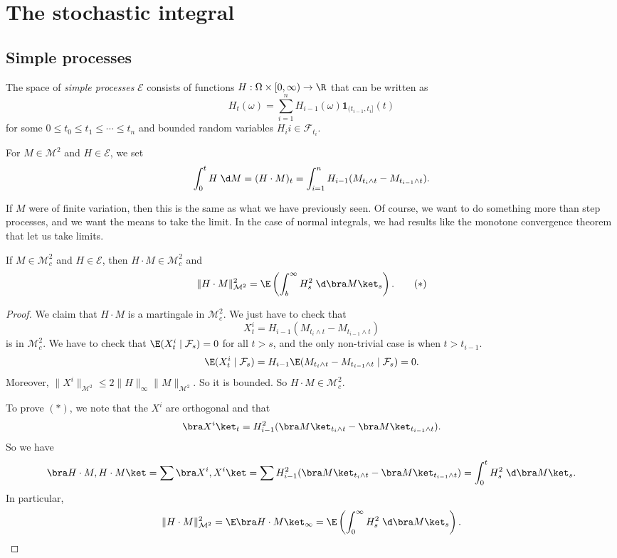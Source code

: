 \documentclass[a4paper]{article}
\begin{document}
\section{The stochastic integral}%
\subsection{Simple processes}

\begin{defi}
  The space of \emph{simple processes} $\mathcal{E}$ consists of functions $H: \Omega \times [0, \infty) \to \R$ that can be written as
  \[
    H_t(\omega) = \sum_{i = 1}^n H_{i - 1}(\omega) \mathbf{1}_{(t_{i - 1}, t_i]} (t)
  \]
  for some $0 \leq t_0 \leq t_1 \leq \cdots \leq t_n$ and bounded random variables $H_ii \in \mathcal{F}_{t_i}$.
\end{defi}

\begin{defi}[$H\cdot M$]
  For $M \in \mathcal{M}^2$ and $H \in \mathcal{E}$, we set
  \[
    \int_0^t H \;\d M = (H\cdot M)_t = \int_{i = 1}^n H_{i - 1} (M_{t_i \wedge t} - M_{t_{i - 1} \wedge t}).
  \]
\end{defi}
If $M$ were of finite variation, then this is the same as what we have previously seen. Of course, we want to do something more than step processes, and we want the means to take the limit. In the case of normal integrals, we had results like the monotone convergence theorem that let us take limits.

\begin{prop}
  If $M \in \mathcal{M}_c^2$ and $H \in \mathcal{E}$, then $H \cdot M \in \mathcal{M}_c^2$ and
  \[
    \|H \cdot M\|_{\mathcal{M}^2}^2 = \E \left(\int_b^\infty H^2_s \;\d \bra M\ket_s\right).\tag{$*$}
  \]
\end{prop}

\begin{proof}
  We claim that $H \cdot M$ is a martingale in $\mathcal{M}_c^2$. We just have to check that
  \[
    X_t^i = H_{i - 1} (M_{t_i \wedge t} - M_{t_{i - 1} \wedge t})
  \]
  is in $\mathcal{M}_c^2$. We have to check that $\E(X_t^i \mid \mathcal{F}_s) = 0$ for all $t > s$, and the only non-trivial case is when $t > t_{i - 1}$.
  \[
    \E (X_t^i \mid \mathcal{F}_s) = H_{i - 1} \E (M_{t_i \wedge t} - M_{t_{i - 1} \wedge t} \mid \mathcal{F}_s) = 0.
  \]
  Moreover, $\|X^i\|_{\mathcal{M}^2} \leq 2 \|H\|_{\infty} \|M\|_{\mathcal{M}^2}$. So it is bounded. So $H \cdot M \in \mathcal{M}_c^2$.

  To prove $(*)$, we note that the $X^i$ are orthogonal and that
  \[
    \bra X^i\ket_t = H_{i - 1}^2 (\bra M\ket_{t_i \wedge t} - \bra M\ket_{t_{i - 1} \wedge t}).
  \]
  So we have
  \[
    \bra H \cdot M, H \cdot M\ket = \sum \bra X^i, X^i\ket = \sum H_{i - 1}^2 (\bra M\ket_{t_i \wedge t} - \bra M\ket_{t_{i - 1} \wedge t}) = \int_0^t H_s^2 \;\d \bra M\ket_s.
  \]
  In particular,
  \[
    \|H \cdot M\|_{\mathcal{M}^2}^2 = \E \bra H \cdot M\ket_\infty = \E \left(\int_0^\infty H_s^2 \;\d \bra M\ket_s\right).\qedhere
  \]
\end{proof}
\end{document}
